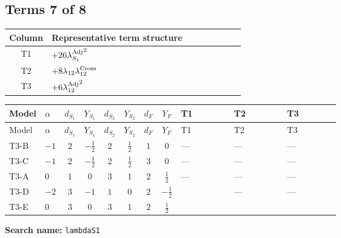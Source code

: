 \documentclass[8pt]{article}
\begin{document}
\begin{landscape}
\subsection*{Terms 7 of 8}
\begin{center}
\begin{tabular}{@{}c >{\raggedright\arraybackslash}p{0.82\linewidth}@{}}
\toprule
Column & Representative term structure \\
\midrule
T1 & \(\displaystyle +26 {\lambda_{S_1}^{\rm Adj}}^2\) \\
\midrule
T2 & \(\displaystyle +8 {\lambda_{12}} {\lambda_{12}^{\rm Cross}}\) \\
\midrule
T3 & \(\displaystyle +6 {\lambda_{12}^{\rm Adj}}^2\) \\
\midrule
\bottomrule
\end{tabular}
\end{center}
\smallskip
\tiny
\begin{longtable}{@{}llcccccc >{\raggedright\arraybackslash}p{0.21\linewidth} >{\raggedright\arraybackslash}p{0.21\linewidth} >{\raggedright\arraybackslash}p{0.21\linewidth}@{}}
\toprule
Model & $\alpha$ & $d_{S_1}$ & $Y_{S_1}$ & $d_{S_2}$ & $Y_{S_2}$ & $d_F$ & $Y_F$ & T1 & T2 & T3 \\
\midrule
\endfirsthead
\toprule
Model & $\alpha$ & $d_{S_1}$ & $Y_{S_1}$ & $d_{S_2}$ & $Y_{S_2}$ & $d_F$ & $Y_F$ & T1 & T2 & T3 \\
\midrule
\endhead
T3-B & $-1$ & $2$ & $-\frac{1}{2}$ & $2$ & $\frac{1}{2}$ & $1$ & $0$ & --- & --- & --- \\
\midrule
T3-C & $-1$ & $2$ & $-\frac{1}{2}$ & $2$ & $\frac{1}{2}$ & $3$ & $0$ & --- & --- & --- \\
\midrule
T3-A & $0$ & $1$ & $0$ & $3$ & $1$ & $2$ & $\frac{1}{2}$ & --- & --- & --- \\
\midrule
T3-D & $-2$ & $3$ & $-1$ & $1$ & $0$ & $2$ & $-\frac{1}{2}$ & \scriptsize\adjustbox{max width=\linewidth}{$\begin{gathered} +26 {\lambda_{S_1}^{\rm Adj}}^2\end{gathered}$} & --- & --- \\
\midrule
T3-E & $0$ & $3$ & $0$ & $3$ & $1$ & $2$ & $\frac{1}{2}$ & \scriptsize\adjustbox{max width=\linewidth}{$\begin{gathered} +26 {\lambda_{S_1}^{\rm Adj}}^2\end{gathered}$} & \scriptsize\adjustbox{max width=\linewidth}{$\begin{gathered} +8 {\lambda_{12}} {\lambda_{12}^{\rm Cross}}\end{gathered}$} & \scriptsize\adjustbox{max width=\linewidth}{$\begin{gathered} +6 {\lambda_{12}^{\rm Adj}}^2\end{gathered}$} \\
\midrule
\bottomrule
\end{longtable}
\clearpage
\noindent\textbf{Search name: }\texttt{lambdaS1}\par\smallskip

\end{landscape}
\end{document}
